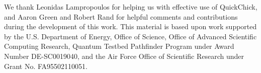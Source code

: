 \documentclass[format=acmsmall, screen=true,review,anonymous, nonacm,pdftex,svgnames]{acmart}
\begin{document}
\begin{acks}                            %
We thank Leonidas Lampropoulos for helping us with effective use of
QuickChick, and Aaron Green and Robert Rand for helpful comments and contributions
during the development of this work. This material is based upon work supported
by the U.S. Department of 
Energy, Office of Science, Office of Advanced Scientific Computing
Research, Quantum Testbed Pathfinder Program under Award Number
DE-SC0019040, and the Air Force Office of Scientific Research under Grant No.
FA95502110051.
\end{acks}



\newpage
\appendix

\end{document}
